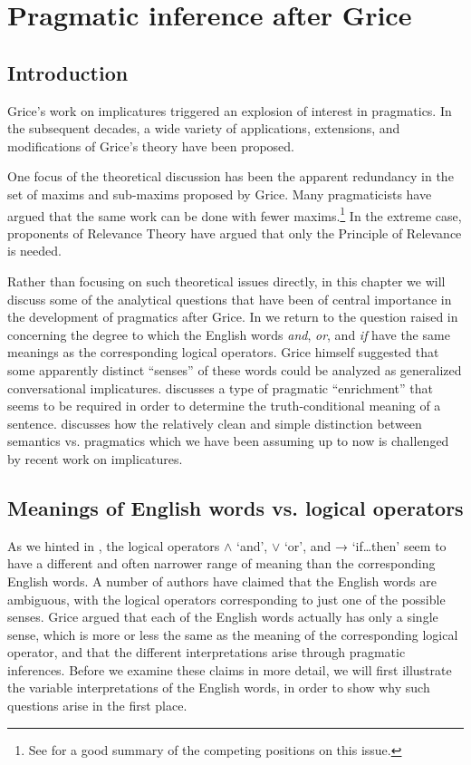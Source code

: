 \chapter{Pragmatic inference after Grice}\label{sec:9}

\section{Introduction}\label{sec:9.1}

Grice’s work on implicatures triggered an explosion of interest in pragmatics. In the subsequent decades, a wide variety of applications, extensions, and modifications of Grice’s theory have been proposed.



One focus of the theoretical discussion has been the apparent redundancy in the set of maxims and sub-maxims proposed by Grice. Many pragmaticists have argued that the same work can be done with fewer maxims.\footnote{See \citet[ch. 3]{Birner20122013} for a good summary of the competing positions on this issue.} In the extreme case, proponents of Relevance Theory have argued that only the Principle of Relevance is needed.



Rather than focusing on such theoretical issues directly, in this chapter we will discuss some of the analytical questions that have been of central importance in the development of pragmatics after Grice. In  we return to the question raised in  concerning the degree to which the English words \textit{and}, \textit{or}, and \textit{if} have the same meanings as the corresponding logical operators. Grice himself suggested that some apparently distinct “senses” of these words could be analyzed as generalized conversational implicatures.  discusses a type of pragmatic “enrichment” that seems to be required in order to determine the truth-conditional meaning of a sentence.  discusses how the relatively clean and simple distinction between semantics vs. pragmatics which we have been assuming up to now is challenged by recent work on implicatures.


\section{Meanings of English words vs. logical operators}\label{sec:9.2}

As we hinted in , the logical operators $\wedge$ ‘and’, $\vee$ ‘or’, and → ‘if…then’ seem to have a different and often narrower range of meaning than the corresponding English words. A number of authors have claimed that the English words are ambiguous, with the logical operators corresponding to just one of the possible senses. Grice argued that each of the English words actually has only a single sense, which is more or less the same as the meaning of the corresponding logical operator, and that the different interpretations arise through pragmatic inferences. Before we examine these claims in more detail, we will first illustrate the variable interpretations of the English words, in order to show why such questions arise in the first place.



